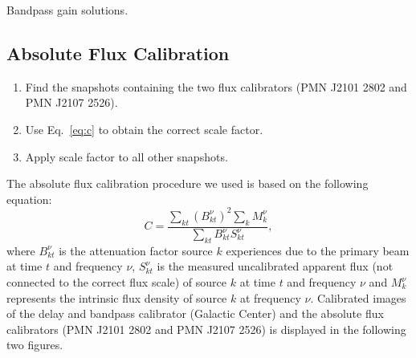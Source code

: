 \documentclass[a0,portrait]{a0poster}
\begin{document}
\begin{multicols}{2}
\begin{minipage}{\columnwidth}
    \makeatletter
    \newcommand{\@captype}{figure}
    \makeatother
    \centering
    \qquad%
    \caption{\color{Green} Bandpass gain solutions.}
  \end{minipage}

\subsection*{Absolute Flux Calibration}
\begin{enumerate}
 \item Find the snapshots containing the two flux calibrators (PMN J2101 2802 and PMN J2107 2526).
 \item Use Eq.~\eqref{eq:c} to obtain the correct scale factor.
 \item Apply scale factor to all other snapshots.
\end{enumerate}
The absolute flux calibration procedure we used is based on the following equation:
\begin{equation}
C = \frac{\sum_{kt}(B_{kt}^{\nu})^2\sum_k{M_{k}^{\nu}}}{\sum_{kt}B_{kt}^{\nu}S_{kt}^{\nu}},\label{eq:c}
\end{equation}
where $B_{kt}^{\nu}$ is the attenuation factor source $k$ experiences due to the primary beam at time $t$ and frequency $\nu$,
$S_{kt}^{\nu}$ is the measured uncalibrated apparent flux (not connected to the correct flux scale) of source $k$ at time $t$ and frequency $\nu$ and $M_{k}^{\nu}$ represents the 
intrinsic flux density of source $k$ at frequency $\nu$. 
Calibrated images of the delay and bandpass calibrator (Galactic Center) and the absolute flux calibrators (PMN J2101 2802 and PMN J2107 2526) is displayed in
the following two figures. 


\end{multicols}
\end{document}

